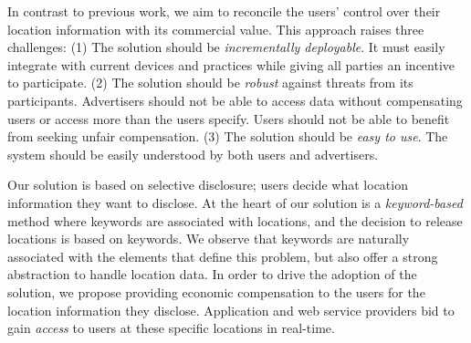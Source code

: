 




In contrast to previous work, we aim to reconcile the users' control over their location information with its commercial value.
This approach raises three challenges:
(1) The solution should be \emph{incrementally deployable}. It must easily integrate with current devices and practices while giving all parties an incentive to participate.
(2) The solution should be \emph{robust} against threats from its participants. Advertisers should not be able to access data without compensating users or access more than the users specify. Users should not be able to benefit from seeking unfair compensation.
(3) The solution should be \emph{easy to use}. The system should be easily understood by both users and advertisers.

Our solution is based on selective disclosure; users decide what location information they want to disclose.
At the heart of our solution is a \emph{keyword-based} method where keywords are associated with locations, 
and the decision to release locations is based on keywords. 
We observe that keywords are naturally associated with the elements that define this problem, but also offer a strong 
abstraction to handle location data.  In order to drive the adoption of the solution,
we propose providing economic compensation to the users for the location information they disclose. 
Application and web service providers bid to gain \emph{access} to users at these specific locations in real-time. 

